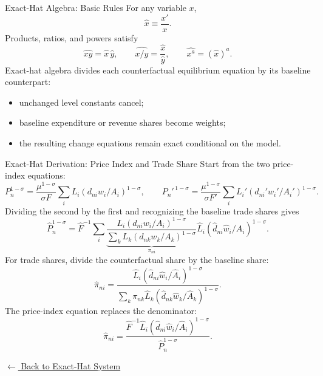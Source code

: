 \documentclass[aspectratio=169,11pt]{beamer}
\newcommand{\wh}[1]{\widehat{#1}}
\newcommand{\backlink}[2]{%
  \hyperlink{#1}{\textcolor{blue1}{\footnotesize
  \(\longleftarrow\) #2}}}
\begin{document}
\begin{frame}{Exact-Hat Algebra: Basic Rules}
  For any variable \(x\),
  \[
    \wh x\equiv\frac{x'}{x}.
  \]
  Products, ratios, and powers satisfy
  \[
    \wh{xy}=\wh x\,\wh y,
    \qquad
    \wh{x/y}=\frac{\wh x}{\wh y},
    \qquad
    \wh{x^a}=(\wh x)^a.
  \]
  Exact-hat algebra divides each counterfactual equilibrium equation by its
  baseline counterpart:
  \begin{itemize}\setlength{\itemsep}{5pt}
    \item unchanged level constants cancel;
    \item baseline expenditure or revenue shares become weights;
    \item the resulting change equations remain exact conditional on the model.
  \end{itemize}
\end{frame}

\begin{frame}[t,label=appHatTrade]{Exact-Hat Derivation: Price Index and Trade Share}
  \scriptsize
  Start from the two price-index equations:
  \[
    P_n^{1-\sigma}
      =\frac{\mu^{1-\sigma}}{\sigma F}
      \sum_iL_i(d_{ni}w_i/A_i)^{1-\sigma},
    \qquad
    P_n'^{\,1-\sigma}
      =\frac{\mu^{1-\sigma}}{\sigma F'}
      \sum_iL_i'(d_{ni}'w_i'/A_i')^{1-\sigma}.
  \]
  Dividing the second by the first and recognizing the baseline trade shares gives
  \[
    \wh P_n^{1-\sigma}
    =\wh F^{-1}\sum_i
      \underbrace{\frac{L_i(d_{ni}w_i/A_i)^{1-\sigma}}
      {\sum_kL_k(d_{nk}w_k/A_k)^{1-\sigma}}}_{\pi_{ni}}
      \wh L_i(\wh d_{ni}\wh w_i/\wh A_i)^{1-\sigma}.
  \]
  For trade shares, divide the counterfactual share by the baseline share:
  \[
    \wh\pi_{ni}
    =\frac{\wh L_i(\wh d_{ni}\wh w_i/\wh A_i)^{1-\sigma}}
      {\sum_k\pi_{nk}\wh L_k
      (\wh d_{nk}\wh w_k/\wh A_k)^{1-\sigma}}.
  \]
  The price-index equation replaces the denominator:
  \[
    \wh\pi_{ni}
    =\frac{\wh F^{-1}\wh L_i
      (\wh d_{ni}\wh w_i/\wh A_i)^{1-\sigma}}
      {\wh P_n^{1-\sigma}}.
  \]

  \vfill
  \hfill\backlink{mainHatSystem}{Back to Exact-Hat System}
\end{frame}
\end{document}
